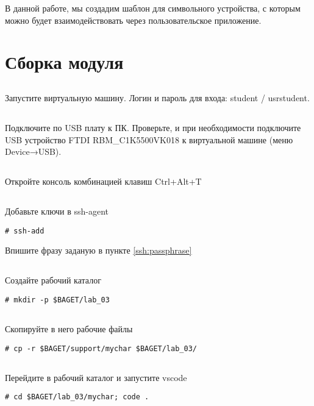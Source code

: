 В данной работе, мы создадим шаблон для символьного устройства, с которым можно будет взаимодействовать через пользовательское приложение.

\section{Сборка модуля}

\subsection{}Запустите виртуальную машину. Логин и пароль для входа: student / usrstudent.

\subsection{}Подключите по USB плату к ПК. Проверьте, и при необходимости подключите USB устройство FTDI RBM\_C1K5500VK018 к виртуальной машине (меню Device→USB).

\subsection{}Откройте консоль комбинацией клавиш Ctrl+Alt+T

\subsection{}Добавьте ключи в ssh-agent
\begin{lstlisting}[style=bash]
# ssh-add
\end{lstlisting}
Впишите фразу заданую в пункте \ref{ssh:passphrase}

\subsection{}Создайте рабочий каталог
\begin{lstlisting}[style=bash]
# mkdir -p $BAGET/lab_03 
\end{lstlisting}

\subsection{}Скопируйте в него рабочие файлы
\begin{lstlisting}[style=bash]
# cp -r $BAGET/support/mychar $BAGET/lab_03/
\end{lstlisting}

\subsection{}Перейдите в рабочий каталог и запустите vscode
\begin{lstlisting}[style=bash]
# cd $BAGET/lab_03/mychar; code .
\end{lstlisting}

